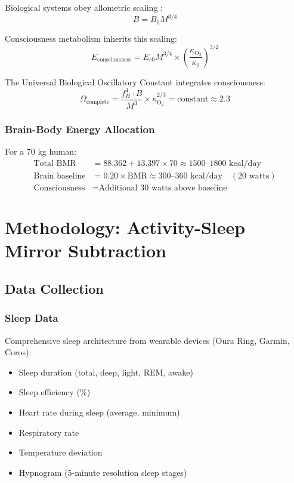 \documentclass[12pt,twocolumn]{article}
\theoremstyle{remark}
\begin{document}
Biological systems obey allometric scaling \citep{west1997general,brown2004toward}:
\begin{equation}
B = B_0 M^{3/4}
\end{equation}

Consciousness metabolism inherits this scaling:
\begin{equation}
E_{\text{consciousness}} = E_{c0} M^{3/4} \times \left(\frac{\kappa_{\text{O}_2}}{\kappa_0}\right)^{3/2}
\end{equation}

The Universal Biological Oscillatory Constant integrates consciousness:
\begin{equation}
\Omega_{\text{complete}} = \frac{f_H^4 \cdot B}{M^3} \times \kappa_{\text{O}_2}^{2/3} = \text{constant} \approx 2.3
\end{equation}

\subsubsection{Brain-Body Energy Allocation}

For a 70 kg human:
\begin{align}
\text{Total BMR} &= 88.362 + 13.397 \times 70 \approx 1500\text{--}1800 \text{ kcal/day} \\
\text{Brain baseline} &= 0.20 \times \text{BMR} \approx 300\text{--}360 \text{ kcal/day} \quad (20\text{ watts}) \\
\text{Consciousness} &= \text{Additional 30 watts above baseline}
\end{align}

\section{Methodology: Activity-Sleep Mirror Subtraction}

\subsection{Data Collection}

\subsubsection{Sleep Data}

Comprehensive sleep architecture from wearable devices (Oura Ring, Garmin, Coros):
\begin{itemize}
\item Sleep duration (total, deep, light, REM, awake)
\item Sleep efficiency (\%)
\item Heart rate during sleep (average, minimum)
\item Respiratory rate
\item Temperature deviation
\item Hypnogram (5-minute resolution sleep stages)
\end{itemize}
\end{document}
